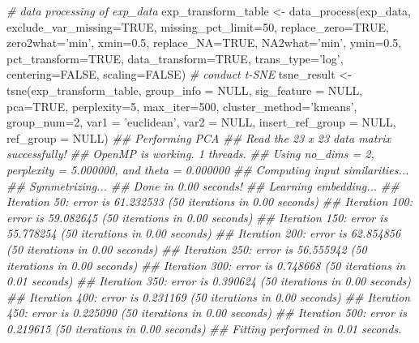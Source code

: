\documentclass[]{article}
\newcommand{\hlnum}[1]{\textcolor[rgb]{0.816,0.125,0.439}{#1}}%
\newcommand{\hlstr}[1]{\textcolor[rgb]{0.251,0.627,0.251}{#1}}%
\newcommand{\hlcom}[1]{\textcolor[rgb]{0.502,0.502,0.502}{\textit{#1}}}%
\newcommand{\hlstd}[1]{\textcolor[rgb]{0.251,0.251,0.251}{#1}}%
\newcommand{\hlkwc}[1]{\textcolor[rgb]{0.251,0.251,0.251}{#1}}%
\newcommand{\hlkwd}[1]{\textcolor[rgb]{0.878,0.439,0.125}{#1}}%
\newenvironment{Shaded}{\begin{myshaded}}{\end{myshaded}}
\newcommand{\KeywordTok}[1]{\hlkwd{#1}}
\newcommand{\DataTypeTok}[1]{\hlkwc{#1}}
\newcommand{\DecValTok}[1]{\hlnum{#1}}
\newcommand{\FloatTok}[1]{\hlnum{#1}}
\newcommand{\StringTok}[1]{\hlstr{#1}}
\newcommand{\CommentTok}[1]{\hlcom{#1}}
\newcommand{\OtherTok}[1]{{#1}}
\newcommand{\NormalTok}[1]{\hlstd{#1}}
\begin{document}
\begin{Shaded}
\begin{Highlighting}[]
\CommentTok{# data processing of exp_data}
\NormalTok{exp_transform_table <-}\StringTok{ }\KeywordTok{data_process}\NormalTok{(exp_data, }\DataTypeTok{exclude_var_missing=}\OtherTok{TRUE}\NormalTok{,}
                                    \DataTypeTok{missing_pct_limit=}\DecValTok{50}\NormalTok{, }
                                    \DataTypeTok{replace_zero=}\OtherTok{TRUE}\NormalTok{, }\DataTypeTok{zero2what=}\StringTok{'min'}\NormalTok{, }
                                    \DataTypeTok{xmin=}\FloatTok{0.5}\NormalTok{, }\DataTypeTok{replace_NA=}\OtherTok{TRUE}\NormalTok{,}
                                    \DataTypeTok{NA2what=}\StringTok{'min'}\NormalTok{, }\DataTypeTok{ymin=}\FloatTok{0.5}\NormalTok{, }
                                    \DataTypeTok{pct_transform=}\OtherTok{TRUE}\NormalTok{,}
                                    \DataTypeTok{data_transform=}\OtherTok{TRUE}\NormalTok{, }\DataTypeTok{trans_type=}\StringTok{'log'}\NormalTok{,}
                                    \DataTypeTok{centering=}\OtherTok{FALSE}\NormalTok{, }\DataTypeTok{scaling=}\OtherTok{FALSE}\NormalTok{)}
\CommentTok{# conduct t-SNE}
\NormalTok{tsne_result <-}\StringTok{ }\KeywordTok{tsne}\NormalTok{(exp_transform_table, }\DataTypeTok{group_info =} \OtherTok{NULL}\NormalTok{,}
                    \DataTypeTok{sig_feature =} \OtherTok{NULL}\NormalTok{, }\DataTypeTok{pca=}\OtherTok{TRUE}\NormalTok{, }\DataTypeTok{perplexity=}\DecValTok{5}\NormalTok{,}
                    \DataTypeTok{max_iter=}\DecValTok{500}\NormalTok{, }\DataTypeTok{cluster_method=}\StringTok{'kmeans'}\NormalTok{,}
                    \DataTypeTok{group_num=}\DecValTok{2}\NormalTok{, }\DataTypeTok{var1 =} \StringTok{'euclidean'}\NormalTok{, }\DataTypeTok{var2 =} \OtherTok{NULL}\NormalTok{,}
                    \DataTypeTok{insert_ref_group =} \OtherTok{NULL}\NormalTok{, }\DataTypeTok{ref_group =} \OtherTok{NULL}\NormalTok{)}
\CommentTok{## Performing PCA}
\CommentTok{## Read the 23 x 23 data matrix successfully!}
\CommentTok{## OpenMP is working. 1 threads.}
\CommentTok{## Using no_dims = 2, perplexity = 5.000000, and theta = 0.000000}
\CommentTok{## Computing input similarities...}
\CommentTok{## Symmetrizing...}
\CommentTok{## Done in 0.00 seconds!}
\CommentTok{## Learning embedding...}
\CommentTok{## Iteration 50: error is 61.232533 (50 iterations in 0.00 seconds)}
\CommentTok{## Iteration 100: error is 59.082645 (50 iterations in 0.00 seconds)}
\CommentTok{## Iteration 150: error is 55.778254 (50 iterations in 0.00 seconds)}
\CommentTok{## Iteration 200: error is 62.854856 (50 iterations in 0.00 seconds)}
\CommentTok{## Iteration 250: error is 56.555942 (50 iterations in 0.00 seconds)}
\CommentTok{## Iteration 300: error is 0.748668 (50 iterations in 0.01 seconds)}
\CommentTok{## Iteration 350: error is 0.390624 (50 iterations in 0.00 seconds)}
\CommentTok{## Iteration 400: error is 0.231169 (50 iterations in 0.00 seconds)}
\CommentTok{## Iteration 450: error is 0.225090 (50 iterations in 0.00 seconds)}
\CommentTok{## Iteration 500: error is 0.219615 (50 iterations in 0.00 seconds)}
\CommentTok{## Fitting performed in 0.01 seconds.}


\end{Highlighting}
\end{Shaded}
\end{document}
